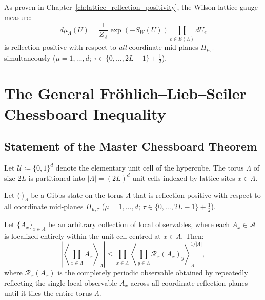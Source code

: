 As proven in Chapter~\ref{ch:lattice_reflection_positivity}, the Wilson lattice gauge measure:
\begin{equation}
d\mu_\Lambda(U) = \frac{1}{Z_\Lambda} \exp\left( -S_W(U) \right) \prod_{e \in E(\Lambda)} dU_e
\end{equation}
is reflection positive with respect to \emph{all} coordinate mid-planes $\Pi_{\mu, \tau}$ simultaneously ($\mu = 1, \dots, d$; $\tau \in \{0, \dots, 2L-1\} + \frac{1}{2}$).

\section{The General Fr\"ohlich--Lieb--Seiler Chessboard Inequality}
\label{sec:general_chessboard_inequality}

\subsection{Statement of the Master Chessboard Theorem}
\label{subsec:master_chessboard_statement}

Let $\mathcal{U} \coloneqq \{0, 1\}^d$ denote the elementary unit cell of the hypercube. The torus $\Lambda$ of size $2L$ is partitioned into $|\Lambda| = (2L)^d$ unit cells indexed by lattice sites $x \in \Lambda$. 

\begin{theorem}
\label{thm:frohlich_lieb_chessboard}
Let $\langle \cdot \rangle_\Lambda$ be a Gibbs state on the torus $\Lambda$ that is reflection positive with respect to all coordinate mid-planes $\Pi_{\mu, \tau}$ ($\mu = 1, \dots, d$; $\tau \in \{0, \dots, 2L-1\} + \frac{1}{2}$).

Let $\{A_x\}_{x \in \Lambda}$ be an arbitrary collection of local observables, where each $A_x \in \mathcal{A}$ is localized entirely within the unit cell centred at $x \in \Lambda$.
Then:
\begin{equation}
\label{eq:chessboard_master_bound}
\left| \left\langle \prod_{x \in \Lambda} A_x \right\rangle_{\Lambda} \right| \le \prod_{x \in \Lambda} \left\langle \prod_{y \in \Lambda} \mathcal{R}_x(A_x)_y \right\rangle_{\Lambda}^{1 / |\Lambda|},
\end{equation}
where $\mathcal{R}_x(A_x)$ is the completely periodic observable obtained by repeatedly reflecting the single local observable $A_x$ across all coordinate reflection planes until it tiles the entire torus $\Lambda$.
\end{theorem}

